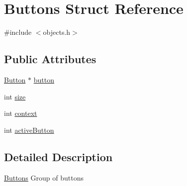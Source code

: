 \hypertarget{struct_buttons}{\section{Buttons Struct Reference}
\label{struct_buttons}
}


{\ttfamily \#include $<$objects.\-h$>$}

\subsection*{Public Attributes}
\begin{DoxyCompactItemize}
\item 
\hyperlink{struct_button}{Button} $\ast$ \hyperlink{struct_buttons_a741ed7bb5347a62472b3408c9e48b393}{button}
\item 
int \hyperlink{struct_buttons_a3ec3d2690b6f02e73a71b89891292422}{size}
\item 
int \hyperlink{struct_buttons_a3c4e94e82358cd6d636bd9e4d898d46c}{context}
\item 
int \hyperlink{struct_buttons_ad25112dd3156a2a1fb7dfb9a4bb00095}{active\-Button}
\end{DoxyCompactItemize}


\subsection{Detailed Description}
\hyperlink{struct_buttons}{Buttons} Group of buttons 

